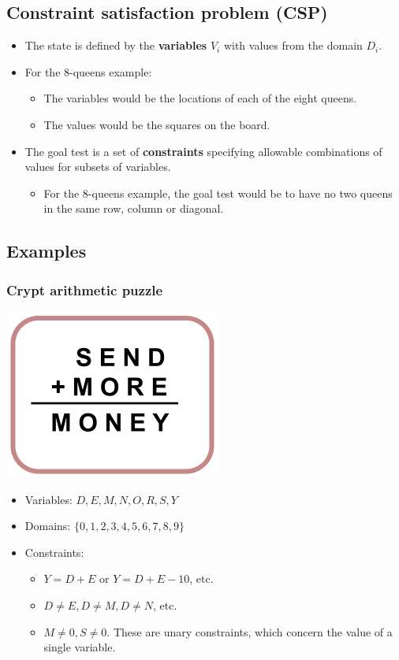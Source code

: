 \documentclass[11pt]{article}
\begin{document}
\subsection{Constraint satisfaction problem (CSP)}
\label{sec:orgff01b63}
\begin{itemize}
\item The state is defined by the \textbf{variables} \(V_i\) with values from the domain \(D_i\).
\item For the 8-queens example:
\begin{itemize}
\item The variables would be the locations of each of the eight queens.
\item The values would be the squares on the board.
\end{itemize}
\item The goal test is a set of \textbf{constraints} specifying allowable combinations of values for subsets of variables.
\begin{itemize}
\item For the 8-queens example, the goal test would be to have no two queens in the same row, column or diagonal.
\end{itemize}
\end{itemize}
\subsection{Examples}
\label{sec:orgcef78ea}

\subsubsection{Crypt arithmetic puzzle}
\label{sec:org036ba3b}
\begin{center}
\includegraphics[height=15em]{./images/crypt-arithmetic-puzzle-image.png}
\end{center}
\begin{itemize}
\item Variables: \(D, E, M, N, O, R, S, Y\)
\item Domains: \(\{0, 1, 2, 3, 4, 5, 6, 7, 8, 9\}\)
\item Constraints:
\begin{itemize}
\item \(Y = D + E\) or \(Y = D + E - 10\), etc.
\item \(D \ne E, D \neq M, D \ne N\), etc.
\item \(M \ne 0, S \ne 0\). These are unary constraints, which concern the value of a single variable.
\end{itemize}
\end{itemize}
\end{document}
